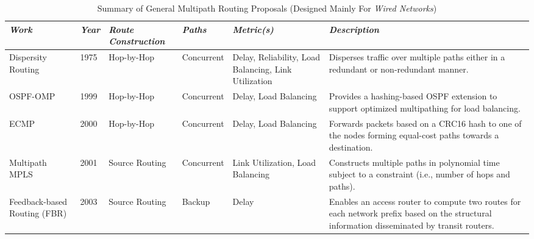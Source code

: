 \documentclass[10pt]{IEEEtran}
\begin{document}
\begin{table*}
\scriptsize
\ssmall
\caption{Summary of General Multipath Routing Proposals (Designed Mainly For \textit{Wired Networks})}
\centering
\label{tab:MultipathRouting}
\begin{tabular}{p{2.5cm}p{0.5cm}p{1.7cm}p{1cm}p{2.3cm}p{7.7cm}}

\toprule
\cellcolor[HTML]{EFEFEF}\textbf{\textit{Work}} & \cellcolor[HTML]{EFEFEF}\textbf{\textit{Year}} & \cellcolor[HTML]{EFEFEF}\textbf{\textit{Route Construction}} & \cellcolor[HTML]{EFEFEF}\textbf{\textit{Paths}} & \cellcolor[HTML]{EFEFEF}\textbf{\textit{Metric(s)}} & \cellcolor[HTML]{EFEFEF}\textbf{\textit{Description}}\\
\midrule

Dispersity Routing \cite{maxemchuk1975} & 1975 & Hop-by-Hop & Concurrent & Delay, Reliability, Load Balancing, Link Utilization & Disperses traffic over multiple paths either in a redundant or non-redundant manner. \\
OSPF-OMP \cite{villamizar1999ospf, villamizar1999mpls} & 1999 & Hop-by-Hop & Concurrent & Delay, Load Balancing & Provides a hashing-based OSPF extension to support optimized multipathing for load balancing. \\
ECMP \cite{hopps2000analysis} & 2000 & Hop-by-Hop & Concurrent & Delay, Load Balancing & Forwards packets based on a CRC16 hash to one of the nodes forming equal-cost paths towards a destination. \\

Multipath MPLS \cite{seok2001dynamic} & 2001 & Source Routing & Concurrent & Link Utilization, \newline Load Balancing & Constructs multiple paths in polynomial time subject to a constraint (i.e., number of hops and paths). \\

Feedback-based Routing (FBR)  \cite{zhu2003feedback} & 2003 & Source Routing & Backup & Delay & Enables an access router to compute two routes for each network prefix based on the structural information disseminated by transit routers.\\


\end{tabular}
\end{table*}
\end{document}
